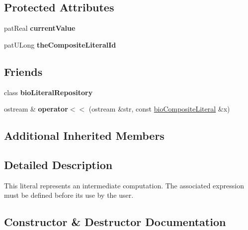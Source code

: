 \subsection*{Protected Attributes}
\begin{DoxyCompactItemize}
\item 
\mbox{\label{classbio_composite_literal_a23881a3ec416d5afe6ed64e8ed46d119}} 
pat\+Real {\bfseries current\+Value}
\item 
\mbox{\label{classbio_composite_literal_a679fdee2e54117054d26edf682959679}} 
pat\+U\+Long {\bfseries the\+Composite\+Literal\+Id}
\end{DoxyCompactItemize}
\subsection*{Friends}
\begin{DoxyCompactItemize}
\item 
\mbox{\label{classbio_composite_literal_a6ea664ca897010b84852832942ab0274}} 
class {\bfseries bio\+Literal\+Repository}
\item 
\mbox{\label{classbio_composite_literal_a097e19aadde1c432f33d7ca58d8dac93}} 
ostream \& {\bfseries operator$<$$<$} (ostream \&str, const \hyperlink{classbio_composite_literal}{bio\+Composite\+Literal} \&x)
\end{DoxyCompactItemize}
\subsection*{Additional Inherited Members}


\subsection{Detailed Description}
This literal represents an intermediate computation. The associated expression must be defined before its use by the user. 

\subsection{Constructor \& Destructor Documentation}
\mbox{\label{classbio_composite_literal_a429e1e95ca034b2e8054bb4ace26f56b}} 
